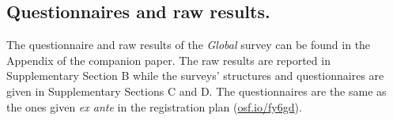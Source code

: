 \documentclass{nature}
\begin{document}
\begin{methods}
\subsection{\small Questionnaires and raw results.} %
The questionnaire and raw results of the \textit{Global} survey can be found in the Appendix of the companion paper.\cite{dechezlepretre_fighting_2022} %
The raw results are reported in Supplementary Section B %
while the surveys' structures and questionnaires are given in Supplementary Sections C and D. The questionnaires are the same as the ones given \textit{ex ante} in the registration plan (\href{https://osf.io/fy6gd}{osf.io/fy6gd}).



\end{methods}
\end{document}

